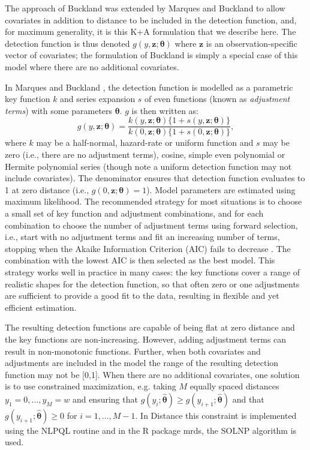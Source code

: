 \documentclass[10pt]{article}
\begin{document}
The approach of Buckland \cite{Buckland:1992wy} was extended by Marques and Buckland \cite{Marques:2003vb} to allow covariates in addition to distance to be included in the detection function, and, for maximum generality, it is this K+A formulation that we describe here.  The detection function is thus denoted $g(y, \mathbf{z};\boldsymbol{\theta})$ where $\mathbf{z}$ is an observation-specific vector of covariates; the formulation of Buckland \cite{Buckland:1992wy} is simply a special case of this model where there are no additional covariates. 

In Marques and Buckland \cite{Marques:2003vb}, the detection function is modelled as a parametric key function $k$ and series expansion $s$ of even functions (known as \textit{adjustment terms}) with some parameters $\boldsymbol{\theta}$. $g$ is then written as:
\begin{equation*}
g(y, \mathbf{z}; \boldsymbol{\theta}) = \frac{k(y, \mathbf{z}; \boldsymbol{\theta}) \{1+s(y, \mathbf{z}; \boldsymbol{\theta})\}}{k(0, \mathbf{z}; \boldsymbol{\theta}) \{1+s(0, \mathbf{z}; \boldsymbol{\theta})\}},
\end{equation*}
where $k$ may be a half-normal, hazard-rate or uniform function and $s$ may be zero (i.e., there are no adjustment terms), cosine, simple even polynomial or Hermite polynomial series (though note a uniform detection function may not include covariates). The denominator ensures that detection function evaluates to 1 at zero distance (i.e., $g(0, \mathbf{z};\boldsymbol{\theta})=1$). Model parameters are estimated using maximum likelihood.  The recommended strategy for most situations is to choose a small set of key function and adjustment combinations, and for each combination to choose the number of adjustment terms using forward selection, i.e., start with no adjustment terms and fit an increasing number of terms, stopping when the Akaike Information Criterion (AIC) fails to decrease \cite{Thomas:2010cf}. The combination with the lowest AIC is then selected as the best model. This strategy works well in practice in many cases: the key functions cover a range of realistic shapes for the detection function, so that often zero or one adjustments are sufficient to provide a good fit to the data, resulting in flexible and yet efficient estimation. 

The resulting detection functions are capable of being flat at zero distance and the key functions are non-increasing. However, adding adjustment terms can result in non-monotonic functions. Further, when both covariates and adjustments are included in the model the range of the resulting detection function may not be [0,1]. When there are no additional covariates, one solution is to use constrained maximization, e.g. taking $M$ equally spaced distances $y_1=0, \ldots , y_{M}=w$ and ensuring that $g(y_i;\boldsymbol{\hat{\theta}})\geq g(y_{i+1}; \boldsymbol{\hat{\theta}})$ and that $g(y_{i+1};\boldsymbol{\hat{\theta}})\geq 0$ for $i=1,\ldots,M-1$. In Distance this constraint is implemented using the NLPQL routine \cite{Schittkowski:1986wj} and in the R package mrds, the SOLNP algorithm \cite{Ye:1987wt} is used.
\end{document}
